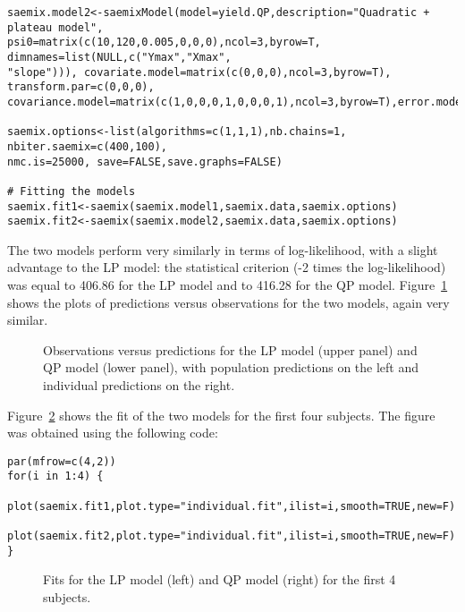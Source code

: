 {\begin{verbatim}
saemix.model2<-saemixModel(model=yield.QP,description="Quadratic + plateau model", 
psi0=matrix(c(10,120,0.005,0,0,0),ncol=3,byrow=T, dimnames=list(NULL,c("Ymax","Xmax", 
"slope"))), covariate.model=matrix(c(0,0,0),ncol=3,byrow=T), transform.par=c(0,0,0), 
covariance.model=matrix(c(1,0,0,0,1,0,0,0,1),ncol=3,byrow=T),error.model="constant")

saemix.options<-list(algorithms=c(1,1,1),nb.chains=1, nbiter.saemix=c(400,100), 
nmc.is=25000, save=FALSE,save.graphs=FALSE)

# Fitting the models
saemix.fit1<-saemix(saemix.model1,saemix.data,saemix.options)
saemix.fit2<-saemix(saemix.model2,saemix.data,saemix.options)
\end{verbatim}
The two models perform very similarly in terms of log-likelihood, with a slight advantage to the LP model: the statistical criterion (-2 times the log-likelihood) was equal to 406.86 for the LP model and to 416.28 for the QP model. Figure~\ref{fig:yielddiagnos} shows the plots of predictions versus observations for the two models, again very similar.

\newpage
\begin{figure}[!h]
\begin{center}
\par \kern -0.5cm
\end{center}
\par \kern -0.5cm
\caption{Observations versus predictions for the LP model (upper panel) and QP model (lower panel), with population predictions on the left and individual predictions on the right.} \label{fig:yielddiagnos}
\end{figure}

Figure~\ref{fig:yieldindiv} shows the fit of the two models for the first four subjects. The figure was obtained using the following code:
\begin{verbatim}
par(mfrow=c(4,2))
for(i in 1:4) {
  plot(saemix.fit1,plot.type="individual.fit",ilist=i,smooth=TRUE,new=F)
  plot(saemix.fit2,plot.type="individual.fit",ilist=i,smooth=TRUE,new=F)
}
\end{verbatim}

\begin{figure}[!h]
\begin{center}
\par \kern -1cm
\end{center}
\par \kern -0.5cm
\caption{Fits for the LP model (left) and QP model (right) for the first 4 subjects.} \label{fig:yieldindiv}
\end{figure}
\clearpage

}

